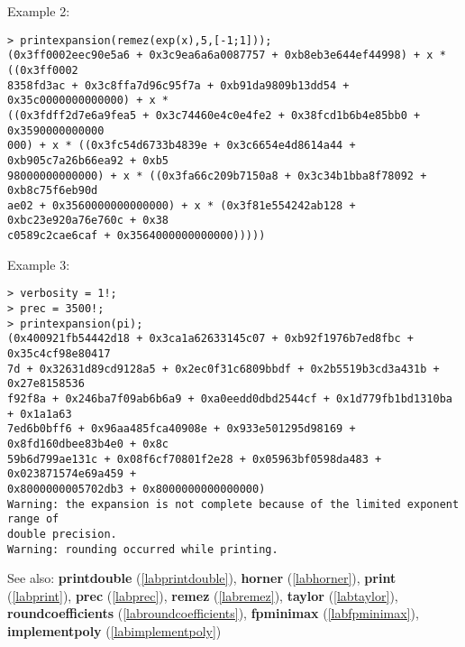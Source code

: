 \noindent Example 2: 
\begin{center}\begin{minipage}{15cm}\begin{Verbatim}[frame=single,commandchars=\\\|\~]
> printexpansion(remez(exp(x),5,[-1;1]));
(0x3ff0002eec90e5a6 + 0x3c9ea6a6a0087757 + 0xb8eb3e644ef44998) + x * ((0x3ff0002
8358fd3ac + 0x3c8ffa7d96c95f7a + 0xb91da9809b13dd54 + 0x35c0000000000000) + x * 
((0x3fdff2d7e6a9fea5 + 0x3c74460e4c0e4fe2 + 0x38fcd1b6b4e85bb0 + 0x3590000000000
000) + x * ((0x3fc54d6733b4839e + 0x3c6654e4d8614a44 + 0xb905c7a26b66ea92 + 0xb5
98000000000000) + x * ((0x3fa66c209b7150a8 + 0x3c34b1bba8f78092 + 0xb8c75f6eb90d
ae02 + 0x3560000000000000) + x * (0x3f81e554242ab128 + 0xbc23e920a76e760c + 0x38
c0589c2cae6caf + 0x3564000000000000)))))
\end{Verbatim}
\end{minipage}\end{center}
\noindent Example 3: 
\begin{center}\begin{minipage}{15cm}\begin{Verbatim}[frame=single,commandchars=\\\|\~]
> verbosity = 1!;
> prec = 3500!;
> printexpansion(pi);
(0x400921fb54442d18 + 0x3ca1a62633145c07 + 0xb92f1976b7ed8fbc + 0x35c4cf98e80417
7d + 0x32631d89cd9128a5 + 0x2ec0f31c6809bbdf + 0x2b5519b3cd3a431b + 0x27e8158536
f92f8a + 0x246ba7f09ab6b6a9 + 0xa0eedd0dbd2544cf + 0x1d779fb1bd1310ba + 0x1a1a63
7ed6b0bff6 + 0x96aa485fca40908e + 0x933e501295d98169 + 0x8fd160dbee83b4e0 + 0x8c
59b6d799ae131c + 0x08f6cf70801f2e28 + 0x05963bf0598da483 + 0x023871574e69a459 + 
0x8000000005702db3 + 0x8000000000000000)
Warning: the expansion is not complete because of the limited exponent range of 
double precision.
Warning: rounding occurred while printing.
\end{Verbatim}
\end{minipage}\end{center}
See also: \textbf{printdouble} (\ref{labprintdouble}), \textbf{horner} (\ref{labhorner}), \textbf{print} (\ref{labprint}), \textbf{prec} (\ref{labprec}), \textbf{remez} (\ref{labremez}), \textbf{taylor} (\ref{labtaylor}), \textbf{roundcoefficients} (\ref{labroundcoefficients}), \textbf{fpminimax} (\ref{labfpminimax}), \textbf{implementpoly} (\ref{labimplementpoly})
